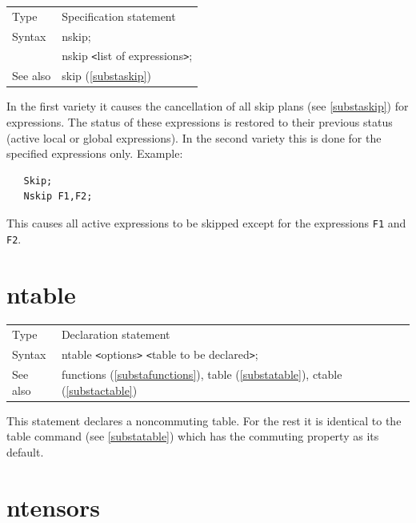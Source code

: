 \noindent \begin{tabular}{ll}
Type & Specification statement\\
Syntax & nskip; \\
       & nskip {\tt<}list of expressions{\tt>};
\\ See also & skip (\ref{substaskip})
\end{tabular} \vspace{4mm}

\noindent In the first variety it causes the cancellation of 
all skip plans (see \ref{substaskip}) for expressions. The 
status of these expressions is restored to their previous status (active 
local or global expressions). In the second variety this is done for the 
specified expressions only. Example:
\begin{verbatim}
   Skip;
   Nskip F1,F2;
\end{verbatim}
This causes all active expressions to be skipped except for the expressions 
\verb:F1: and \verb:F2:. \vspace{10mm}


\section{ntable}
\label{substantable}

\noindent \begin{tabular}{ll}
Type & Declaration statement\\
Syntax & ntable {\tt<}options{\tt>} {\tt<}table to be 
declared{\tt>}; \\
See also & functions (\ref{substafunctions}), table (\ref{substatable}),
        ctable (\ref{substactable})
\end{tabular} \vspace{4mm}

\noindent This statement declares a 
noncommuting table. For the 
rest it is identical to the table command (see 
\ref{substatable}) which has the commuting property as its default. 
\vspace{10mm}

 
\section{ntensors}
\label{substantensors}

